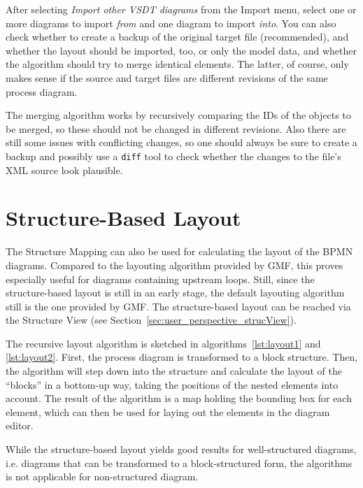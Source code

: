 After selecting \emph{Import other VSDT diagrams} from the Import menu, select
one or more diagrams to import \emph{from} and one diagram to import \emph{into}.
You can also check whether to create a backup of the original target file
(recommended), and whether the layout should be imported, too, or only the model
data, and whether the algorithm should try to merge identical elements.  The
latter, of course, only makes sense if the source and target files are different
revisions of the same process diagram.

The merging algorithm works by recursively comparing the IDs of the objects to be
merged, so these should not be changed in different revisions.  Also there are
still some issues with conflicting changes, so one should always be sure to create
a backup and possibly use a \texttt{diff} tool to check whether the changes to
the file's XML source look plausible.



\section{Structure-Based Layout}
\label{sec:user_features_layout}

The Structure Mapping can also be used for calculating the layout of the BPMN
diagrams.  Compared to the layouting algorithm provided by GMF, this proves
especially useful for diagrams containing upstream loops.  Still, since the
structure-based layout is still in an early stage, the default layouting algorithm
still is the one provided by GMF.  The structure-based layout can be reached via
the Structure View (see Section~\ref{sec:user_perspective_strucView}).

The recursive layout algorithm is sketched in algorithms~\ref{lst:layout1} and
\ref{lst:layout2}.  First, the process diagram is transformed to a block structure.
Then, the algorithm will step down into the structure and calculate the layout of
the ``blocks'' in a bottom-up way, taking the positions of the nested elements
into account.  The result of the algorithm is a map holding the bounding box for
each element, which can then be used for laying out the elements in the diagram
editor.

While the structure-based layout yields good results for well-structured diagrams,
i.e. diagrams that can be transformed to a block-structured form, the algorithms
is not applicable for non-structured diagram.

